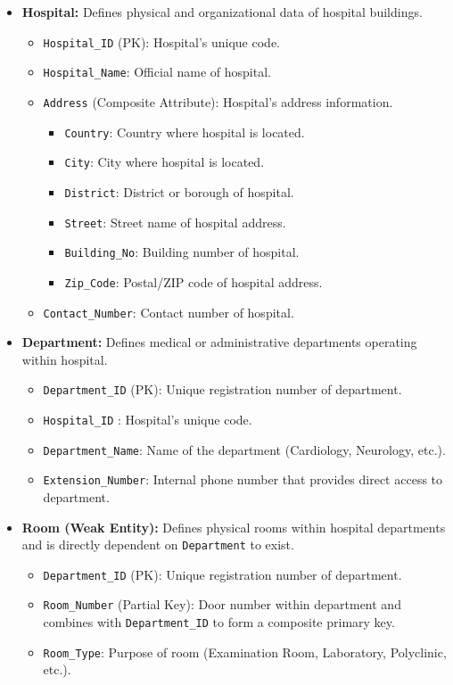 \documentclass[12pt,a4paper]{article}
\begin{document}
\begin{itemize}[label=\textbf{--}]
	\item \textbf{Hospital:} Defines physical and organizational data of hospital buildings.
	      \begin{itemize}[label=$\bullet$]
		      \item \texttt{Hospital\_ID} (PK): Hospital's unique code.
		      \item \texttt{Hospital\_Name}: Official name of hospital.
		      \item \texttt{Address} (Composite Attribute): Hospital's address information.
		            \begin{itemize}[label=$\circ$]
			            \item \texttt{Country}: Country where hospital is located.
			            \item \texttt{City}: City where hospital is located.
			            \item \texttt{District}: District or borough of hospital.
			            \item \texttt{Street}: Street name of hospital address.
			            \item \texttt{Building\_No}: Building number of hospital.
			            \item \texttt{Zip\_Code}: Postal/ZIP code of hospital address.
		            \end{itemize}
		      \item \texttt{Contact\_Number}: Contact number of hospital.
	      \end{itemize}

	\item \textbf{Department:} Defines medical or administrative departments operating within hospital.
	      \begin{itemize}[label=$\bullet$]
		      \item \texttt{Department\_ID} (PK): Unique registration number of department.
		      \item \texttt{Hospital\_ID} : Hospital's unique code.
		      \item \texttt{Department\_Name}: Name of the department (Cardiology, Neurology, etc.).
		      \item \texttt{Extension\_Number}: Internal phone number that provides direct access to department.
	      \end{itemize}

	\item \textbf{Room (Weak Entity):} Defines physical rooms within hospital departments and is directly dependent on \texttt{Department} to exist.
	      \begin{itemize}[label=$\bullet$]
		      \item \texttt{Department\_ID} (PK): Unique registration number of department.
		      \item \texttt{Room\_Number} (Partial Key): Door number within department and combines with \texttt{Department\_ID} to form a composite primary key.
		      \item \texttt{Room\_Type}: Purpose of room (Examination Room, Laboratory, Polyclinic, etc.).
	      \end{itemize}


\end{itemize}
\end{document}
